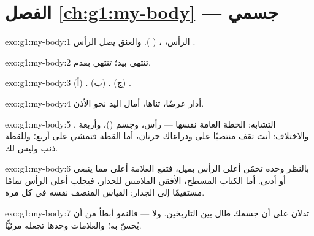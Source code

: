 \section*{الفصل \ref{ch:g1:my-body} --- جسمي}

\begin{solution}{exo:g1:my-body:1}
الرأس، ،  ( ). والعنق يصل الرأس .
\end{solution}

\begin{solution}{exo:g1:my-body:2}
 تنتهي بيد؛  تنتهي بقدم.
\end{solution}

\begin{solution}{exo:g1:my-body:3}
(أ) . (ب) . (ج) .
\end{solution}

\begin{solution}{exo:g1:my-body:4}
 أدار  عرضًا،  ثناها،  أمال اليد نحو
الأذن.
\end{solution}

\begin{solution}{exo:g1:my-body:5}
التشابه: الخطة العامة نفسها --- رأس، وجسم ()، وأربعة .
والاختلاف: أنت تقف منتصبًا على  وذراعاك حرتان، أما القطة
فتمشي على أربع؛ وللقطة ذنب وليس لك.
\end{solution}

\begin{solution}{exo:g1:my-body:6}
بالنظر وحده تخمّن أعلى الرأس بميل، فتقع العلامة أعلى مما ينبغي أو
أدنى. أما الكتاب المسطح، الأفقي الملامس للجدار، فيجلب أعلى الرأس
تمامًا مستقيمًا إلى الجدار: القياس المنصف نفسه في كل مرة.
\end{solution}

\begin{solution}{exo:g1:my-body:7}
تدلان على أن جسمك طال بين التاريخين. ولا --- فالنمو أبطأ من أن
يُحسّ به؛ والعلامات وحدها تجعله مرئيًّا.
\end{solution}

